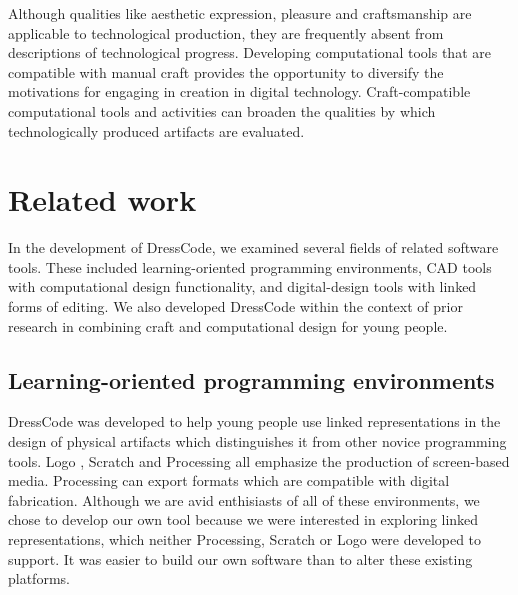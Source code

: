 \documentclass{sigchi}
\begin{document}
Although qualities like aesthetic expression, pleasure and craftsmanship are applicable to technological production, they are frequently absent from descriptions of technological progress. Developing computational tools that are compatible with manual craft provides the opportunity to diversify the motivations for engaging in creation in digital technology. Craft-compatible computational tools and activities can broaden the qualities by which technologically produced artifacts are evaluated.

\section{Related work}
In the development of DressCode, we examined several fields of related software tools. These included learning-oriented programming environments, CAD tools with computational design functionality, and digital-design tools with linked forms of editing. We also developed DressCode within the context of prior research in combining craft and computational design for young people.

\subsection{Learning-oriented programming environments}
DressCode was developed to help young people use linked representations in the design of physical artifacts which distinguishes it from other novice programming tools. Logo \cite{papert}, Scratch \cite{resnick2} and Processing \cite{processing} all emphasize the production of screen-based media. Processing can export formats which are compatible with digital fabrication. Although we are avid enthisiasts of all of these environments, we chose to develop our own tool because we were interested in exploring linked representations, which neither Processing, Scratch or Logo were developed to support. It was easier to build our own software than to alter these existing platforms.
\end{document}
